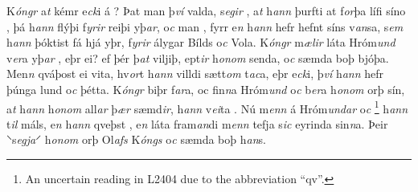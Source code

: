 K\textit{óngr} a\textit{t}  kémr e\textit{ck}i á  ? Þat man þ\textit{ví} valda, s\textit{egir} , a\textit{t} h\textit{ann} 
 þurfti at f\textit{or}þa lífi síno , 
þá h\textit{ann}
flýþi   f\textit{yrir} reiþi yþ\textit{ar},  o\textit{c}  man  , fyrr e\textit{n} h\textit{ann} hefr  hefnt síns
v\textit{an}sa, s\textit{em} h\textit{ann} þóktist fá hjá yþr, f\textit{yrir}
álygar  Bílds o\textit{c} Vola. 
K\textit{óngr} m\textit{ælir}  
 láta Hróm\textit{und} 
v\textit{er}a  yþ\textit{ar} , eþr ei? 
ef þér þ\textit{at} viljiþ,    ept\textit{ir} h\textit{onom} senda, o\textit{c} sæmda boþ bjóþa.
Men\textit{n} qváþost ei   vita, 
hv\textit{or}t h\textit{ann} villdi sætt\textit{om} t\textit{ac}a,
eþr e\textit{ck}i, þ\textit{ví} h\textit{ann} hefr þúnga lund o\textit{c} þétta. K\textit{óngr} biþr    f\textit{ar}a, oc  fin\textit{n}a Hróm\textit{und}
o\textit{c} b\textit{er}a h\textit{onom} orþ sín, a\textit{t} h\textit{ann}  h\textit{onom} all\textit{ar} þ\textit{ær} sæmd\textit{ir},   h\textit{ann}  v\textit{ei}ta  . 
Nú   m\textit{enn} á   Hróm\textit{undar} o\textit{c} 
\footnote{
	An uncertain reading in L2404 due to the abbreviation \enquote{qv}.}
 h\textit{ann} t\textit{il} máls,
e\textit{n} h\textit{ann} qveþst  ,   e\textit{n}  láta fram\textit{an}di m\textit{enn} tefja s\textit{ic} eyrinda sin\textit{n}a. Þeir ⸌s\textit{egja}⸍ h\textit{onom} orþ Ol\textit{afs} K\textit{óngs} o\textit{c} sæmda boþ h\textit{an}s.
